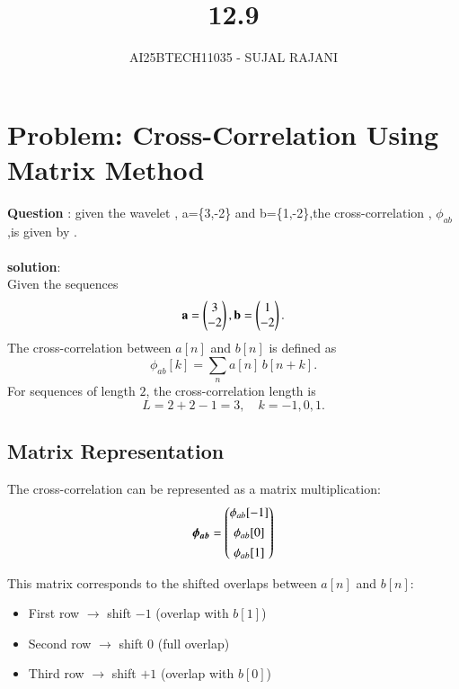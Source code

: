 \documentclass[journal,12pt,onecolumn]{IEEEtran}
\begin{document}
\title{12.9}
\author{AI25BTECH11035 - SUJAL RAJANI}
{\let\newpage\relax\maketitle}
\section*{Problem: Cross-Correlation Using Matrix Method}
\textbf{Question }:
given the wavelet , a=\{3,-2\} and b=\{1,-2\},the cross-correlation , $\phi_{ab}$,is given by .
\\
\\
\textbf{solution}:
\\
Given the sequences
\begin{align*}
\mathbf{a} = \begin{pmatrix}3\\-2\end{pmatrix}, \mathbf{ b} = \begin{pmatrix}1\\-2\end{pmatrix}.
\end{align*}
The cross-correlation between $a[n]$ and $b[n]$ is defined as
\[
\phi_{ab}[k] = \sum_{n} a[n]\, b[n+k].
\]
For sequences of length $2$, the cross-correlation length is
\[
L = 2+2-1 = 3, \quad k = -1, 0, 1.
\]

\subsection*{Matrix Representation}

The cross-correlation can be represented as a matrix multiplication:
\[
\boldsymbol{{\phi}_{ab}}=
\begin{pmatrix}
\phi_{ab}[-1] \\[0.4em]
\phi_{ab}[0] \\[0.4em]
\phi_{ab}[1]
\end{pmatrix}
\]

\noindent
This matrix corresponds to the shifted overlaps between $a[n]$ and $b[n]$:

\begin{itemize}
    \item First row $\rightarrow$ shift $-1$ (overlap with $b[1]$)
    \item Second row $\rightarrow$ shift $0$ (full overlap)
    \item Third row $\rightarrow$ shift $+1$ (overlap with $b[0]$)
\end{itemize}
\end{document}
